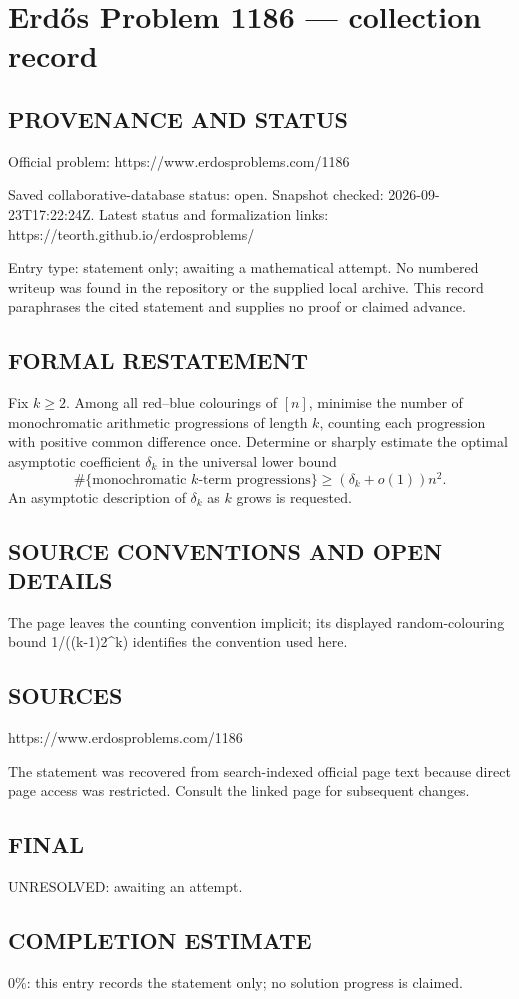 \section*{Erd\H{o}s Problem 1186 --- collection record}

\subsection*{PROVENANCE AND STATUS}
Official problem: https://www.erdosproblems.com/1186

Saved collaborative-database status: open.
Snapshot checked: 2026-09-23T17:22:24Z.
Latest status and formalization links: https://teorth.github.io/erdosproblems/

Entry type: statement only; awaiting a mathematical attempt. No numbered writeup was found in the repository or the supplied local archive. This record paraphrases the cited statement and supplies no proof or claimed advance.

\subsection*{FORMAL RESTATEMENT}
Fix $k\geq2$. Among all red--blue colourings of $[n]$, minimise the number of monochromatic arithmetic progressions of length $k$, counting each progression with positive common difference once. Determine or sharply estimate the optimal asymptotic coefficient $\delta_k$ in the universal lower bound
\[\#\{\text{monochromatic }k\text{-term progressions}\}\geq (\delta_k+o(1))n^2.\]
An asymptotic description of $\delta_k$ as $k$ grows is requested.

\subsection*{SOURCE CONVENTIONS AND OPEN DETAILS}
The page leaves the counting convention implicit; its displayed random-colouring bound 1/((k-1)2^k) identifies the convention used here.

\subsection*{SOURCES}
https://www.erdosproblems.com/1186

The statement was recovered from search-indexed official page text because direct page access was restricted. Consult the linked page for subsequent changes.

\subsection*{FINAL}
UNRESOLVED: awaiting an attempt.

\subsection*{COMPLETION ESTIMATE}
$0\%$: this entry records the statement only; no solution progress is claimed.
